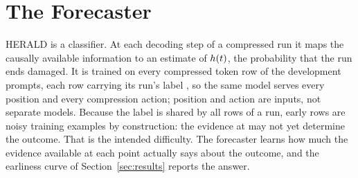 \section{The Forecaster}
\label{sec:forecaster}

HERALD is a classifier. At each decoding step \step{} of a compressed run it
maps the causally available information \info{} to an estimate of
$h(t)$, the probability that the run ends damaged. It is trained on
every compressed token row of the development prompts, each row carrying its
run's label \dmg, so the same model serves every position and every
compression action; position and action are inputs, not separate models.
Because the label is shared by all rows of a run, early rows are noisy
training examples by construction: the evidence at \step{} may not yet
determine the outcome. That is the intended difficulty. The forecaster
learns how much the evidence available at each point actually says about the
outcome, and the earliness curve of Section~\ref{sec:results} reports the
answer.

